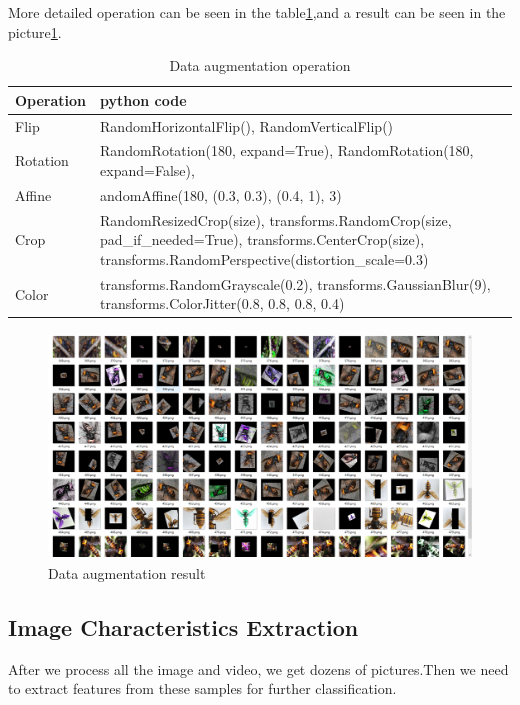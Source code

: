 \documentclass[12pt]{article}
\begin{document}
More detailed operation can be seen in the table\ref{augm},and a result can be seen in the picture\ref{augres}.

\begin{table}[H]
	\caption{Data augmentation operation}  \label{augm}
	\small
	\begin{center}  
		\begin{tabular}{|p{2cm}|p{14cm}|}  
			\hline  
			Operation &   python code\footnotemark[2]\\ \hline  
			Flip& RandomHorizontalFlip(),
			RandomVerticalFlip()\\ \hline  
			Rotation &RandomRotation(180, expand=True),
			RandomRotation(180, expand=False),\\  
			\hline 
			Affine& andomAffine(180, (0.3, 0.3), (0.4, 1), 3) \\  
			\hline  
			   Crop&RandomResizedCrop(size),
			   transforms.RandomCrop(size, pad\_if\_needed=True),
			   transforms.CenterCrop(size),
			   transforms.RandomPerspective(distortion\_scale=0.3) \\  
			\hline
			 Color &  transforms.RandomGrayscale(0.2),
			 transforms.GaussianBlur(9),
			 transforms.ColorJitter(0.8, 0.8, 0.8, 0.4)\\  
			\hline
	
		\end{tabular}  
	\end{center}  
\end{table}


\begin{figure}[H]
	\small
	\centering
	\includegraphics[width=14cm,height=6cm]{./pictures/angres.png}
	\caption{Data augmentation result}\label{augres}

\end{figure}


\subsection{Image Characteristics Extraction}
After we process all the image and video, we get dozens of pictures.Then we need to extract features from these samples for further classification.
\end{document}
